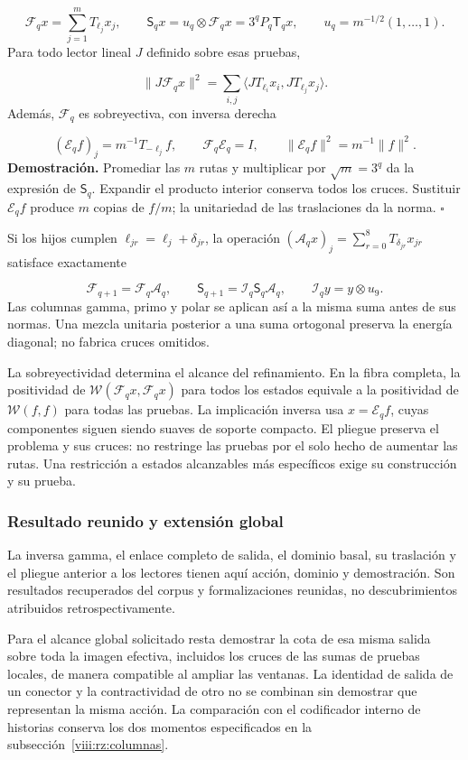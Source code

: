 \[
\mathcal F_qx=\sum_{j=1}^mT_{\ell_j}x_j,\qquad
\mathsf S_qx=u_q\otimes\mathcal F_qx=3^qP_q\mathsf T_qx,
\qquad u_q=m^{-1/2}(1,\ldots,1).
\]
Para todo lector lineal \(J\) definido sobre esas pruebas,

\[
\|J\mathcal F_qx\|^2
=\sum_{i,j}\langle JT_{\ell_i}x_i,JT_{\ell_j}x_j\rangle.
\]
Además, \(\mathcal F_q\) es sobreyectiva, con inversa derecha

\[
(\mathcal E_qf)_j=m^{-1}T_{-\ell_j}f,\qquad
\mathcal F_q\mathcal E_q=I,\qquad
\|\mathcal E_qf\|^2=m^{-1}\|f\|^2.
\]
\textbf{Demostración.} Promediar las \(m\) rutas y multiplicar por \(\sqrt m=3^q\) da la expresión de \(\mathsf S_q\). Expandir el producto interior conserva todos los cruces. Sustituir \(\mathcal E_qf\) produce \(m\) copias de \(f/m\); la unitariedad de las traslaciones da la norma. \hfill\(\square\)

Si los hijos cumplen \(\ell_{jr}=\ell_j+\delta_{jr}\), la operación \((\mathcal A_qx)_j=\sum_{r=0}^8T_{\delta_{jr}}x_{jr}\) satisface exactamente

\[
\mathcal F_{q+1}=\mathcal F_q\mathcal A_q,\qquad
\mathsf S_{q+1}=\mathcal I_q\mathsf S_q\mathcal A_q,\qquad
\mathcal I_qy=y\otimes u_9.
\]
Las columnas gamma, primo y polar se aplican así a la misma suma antes de sus normas. Una mezcla unitaria posterior a una suma ortogonal preserva la energía diagonal; no fabrica cruces omitidos.

La sobreyectividad determina el alcance del refinamiento. En la fibra completa, la positividad de \(\mathscr W(\mathcal F_qx,\mathcal F_qx)\) para todos los estados equivale a la positividad de \(\mathscr W(f,f)\) para todas las pruebas. La implicación inversa usa \(x=\mathcal E_qf\), cuyas componentes siguen siendo suaves de soporte compacto. El pliegue preserva el problema y sus cruces: no restringe las pruebas por el solo hecho de aumentar las rutas. Una restricción a estados alcanzables más específicos exige su construcción y su prueba.

\subsubsection*{Resultado reunido y extensión global}
La inversa gamma, el enlace completo de salida, el dominio basal, su traslación y el pliegue anterior a los lectores tienen aquí acción, dominio y demostración. Son resultados recuperados del corpus y formalizaciones reunidas, no descubrimientos atribuidos retrospectivamente.

Para el alcance global solicitado resta demostrar la cota de esa misma salida sobre toda la imagen efectiva, incluidos los cruces de las sumas de pruebas locales, de manera compatible al ampliar las ventanas. La identidad de salida de un conector y la contractividad de otro no se combinan sin demostrar que representan la misma acción. La comparación con el codificador interno de historias conserva los dos momentos especificados en la subsección~\ref{viii:rz:columnas}.

